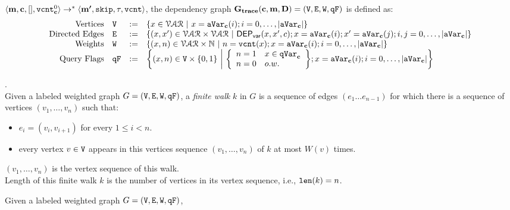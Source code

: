 {{\begin{defn}
$\langle {\boldsymbol{\mathbf{m}}}, {\boldsymbol{\mathbf{c}}}, [], \mathtt{vcnt}^0_{{\boldsymbol{\mathbf{c}}}} \rangle 
\to^{*}
\langle {\boldsymbol{\mathbf{m'}}}, \mathtt{skip}, \mathtt{\tau}, \mathtt{vcnt} \rangle$,
the dependency graph $\bf{G_{trace}}({\boldsymbol{\mathbf{c}}}, {\boldsymbol{\mathbf{m}}}, D) = (\mathtt{V}, \mathtt{E}, \mathtt{W}, \mathtt{qF})$ is defined as:
%
\[
\begin{array}{rlcl}
  \text{Vertices} &
  \vertxs & := & \left\{ 
  x \in \mathcal{VAR}
  ~ \middle\vert ~
  x = \avar_{\ssa{c}}(i); i = 0, \ldots, |\avar_{\ssa{c}}| 
  \right\}
  \\
  \text{Directed Edges} &
  \edges & := & 
  \left\{ 
  (x, x') \in \mathcal{VAR} \times \mathcal{VAR}
  ~ \middle\vert ~
  \vardep(x, x', c); 
  x = \avar_{\ssa{c}}(i); x' = \avar_{\ssa{c}}(j); i,j = 0, \ldots, |\avar_{\ssa{c}}| 
  \right\}
  \\
  \text{Weights} &
  \weights & := & 
  \left\{ 
  (x, n) \in \mathcal{VAR} \times \mathbb{N}
  ~ \middle\vert ~
  n = \vcounter(x); x = \avar_{\ssa{c}}(i); i = 0, \ldots, |\avar_{\ssa{c}}|
  \right\}
  \\
  \text{Query Flags} &
  \qflag & := & 
  \left\{(x, n)  \in \vertxs \times \{0, 1\} 
  ~ \middle\vert ~
  \left\{
  \begin{array}{ll}
  n = 1 & x \in \qvar_{\ssa{c}} \\ 
  n = 0 & o.w.
  \end{array}
  \right\};
  x = \avar_{\ssa{c}}(i); i = 0, \ldots, |\avar_{\ssa{c}}|
  \right\}
\end{array}
\]
\end{defn}
%
%
\begin{defn}.
\label{def:finitewalk}
\\
Given a labeled weighted graph $G = (\mathtt{V}, \mathtt{E}, \mathtt{W}, \mathtt{qF})$, a \emph{finite walk} $k$ in $G$ is a sequence of edges $(e_1 \ldots e_{n - 1})$ 
for which there is a sequence of vertices $(v_1, \ldots, v_{n})$ such that:
\begin{itemize}
    \item $e_i = (v_{i},v_{i + 1})$ for every $1 \leq i < n$.
    \item every vertex $v \in \mathtt{V}$ appears in this vertices sequence $(v_1, \ldots, v_{n})$ of $k$ at most $W(v)$ times.  
\end{itemize}
$(v_1, \ldots, v_{n})$ is the vertex sequence of this walk.
\\
%
Length of this finite walk $k$ is the number of vertices in its vertex sequence, i.e., $\mathtt{len}(k) = n$.
\end{defn}
%
Given a labeled weighted graph $G = (\mathtt{V}, \mathtt{E}, \mathtt{W}, \mathtt{qF})$, 
}}
